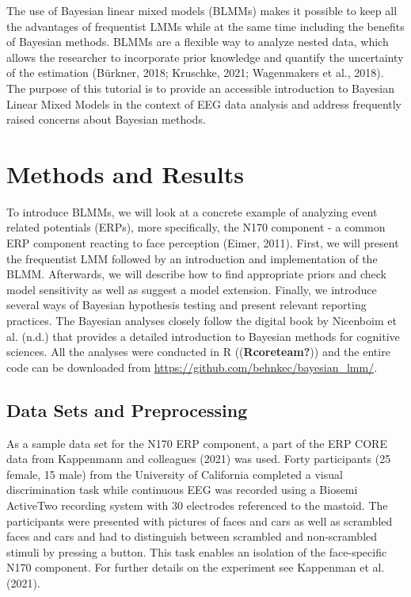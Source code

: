 \documentclass[
  doc,12pt,floatsintext]{apa7}
\begin{document}
The use of Bayesian linear mixed models (BLMMs) makes it possible to keep all the advantages of frequentist LMMs while at the same time including the benefits of Bayesian methods. BLMMs are a flexible way to analyze nested data, which allows the researcher to incorporate prior knowledge and quantify the uncertainty of the estimation (Bürkner, 2018; Kruschke, 2021; Wagenmakers et al., 2018). The purpose of this tutorial is to provide an accessible introduction to Bayesian Linear Mixed Models in the context of EEG data analysis and address frequently raised concerns about Bayesian methods.

\section{Methods and Results}\label{methods-and-results}

To introduce BLMMs, we will look at a concrete example of analyzing event related potentials (ERPs), more specifically, the N170 component - a common ERP component reacting to face perception (Eimer, 2011). First, we will present the frequentist LMM followed by an introduction and implementation of the BLMM. Afterwards, we will describe how to find appropriate priors and check model sensitivity as well as suggest a model extension. Finally, we introduce several ways of Bayesian hypothesis testing and present relevant reporting practices. The Bayesian analyses closely follow the digital book by Nicenboim et al. (n.d.) that provides a detailed introduction to Bayesian methods for cognitive sciences. All the analyses were conducted in R ((\textbf{Rcoreteam?})) and the entire code can be downloaded from \url{https://github.com/behnkec/bayesian_lmm/}.

\subsection{Data Sets and Preprocessing}\label{data-sets-and-preprocessing}

As a sample data set for the N170 ERP component, a part of the ERP CORE data from Kappenmann and colleagues (2021) was used. Forty participants (25 female, 15 male) from the University of California completed a visual discrimination task while continuous EEG was recorded using a Biosemi ActiveTwo recording system with 30 electrodes referenced to the mastoid. The participants were presented with pictures of faces and cars as well as scrambled faces and cars and had to distinguish between scrambled and non-scrambled stimuli by pressing a button. This task enables an isolation of the face-specific N170 component. For further details on the experiment see Kappenman et al. (2021).
\end{document}
